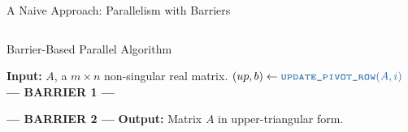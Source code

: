 \begin{frame}{A Naive Approach: Parallelism with Barriers}
	
	\pause 
	\begin{columns}[c] %
	
	 \begin{column}{0.55\textwidth}
	   \begin{block}{Barrier-Based Parallel Algorithm}
	     \footnotesize
	     \begin{algorithmic}[1]
	       \State \textbf{Input:} $A$, a $m \times n$ non-singular real matrix.
	         \State $(up, b) \gets \textcolor{pivotblue}{\Call{\texttt{update\_pivot\_row}}{A, i}}$
	         \State \textcolor{depred}{\textbf{--- BARRIER 1 ---}}
	         
	          
	           \State \textcolor{updategreen}{}
	         \EndFor
	         
	         \State \textcolor{depred}{\textbf{--- BARRIER 2 ---}}
	       \EndFor
	       \State \textbf{Output:} Matrix $A$ in upper-triangular form.
	     \end{algorithmic}
	   \end{block}
	 \end{column}
	\end{columns}
\end{frame}